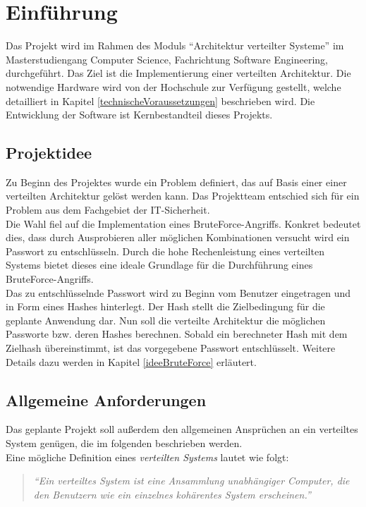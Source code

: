 \chapter{Einführung}
Das Projekt wird im Rahmen des Moduls \enquote{Architektur verteilter Systeme} im Masterstudiengang Computer Science, Fachrichtung Software Engineering, durchgeführt.  Das Ziel ist die Implementierung einer verteilten Architektur. Die notwendige Hardware wird von der Hochschule zur Verfügung gestellt, welche detailliert in Kapitel \ref{technischeVoraussetzungen} beschrieben wird.
Die Entwicklung der Software ist Kernbestandteil dieses Projekts. 
\section{Projektidee}
Zu Beginn des Projektes wurde ein Problem definiert, das auf Basis einer einer verteilten Architektur gelöst werden kann. Das Projektteam entschied sich für ein Problem aus dem Fachgebiet der IT-Sicherheit.\\
Die Wahl fiel auf die Implementation eines BruteForce-Angriffs. Konkret bedeutet dies, dass durch Ausprobieren aller möglichen Kombinationen versucht wird ein Passwort zu entschlüsseln. Durch die hohe Rechenleistung eines verteilten Systems bietet dieses eine ideale Grundlage für die Durchführung eines BruteForce-Angriffs.\\
 Das zu entschlüsselnde Passwort wird zu Beginn vom Benutzer eingetragen und in Form eines Hashes hinterlegt. Der Hash stellt die Zielbedingung für die geplante Anwendung dar. Nun soll die verteilte Architektur die möglichen Passworte bzw. deren Hashes berechnen. Sobald ein berechneter Hash mit dem Zielhash übereinstimmt, ist das vorgegebene Passwort entschlüsselt. Weitere Details dazu werden in Kapitel \ref{ideeBruteForce} erläutert. \\

\section{Allgemeine Anforderungen}
\label{allgemeineAnforderungen}
Das geplante Projekt soll außerdem den allgemeinen Ansprüchen an ein verteiltes System genügen, die im folgenden beschrieben werden. \\
Eine mögliche Definition eines \emph{verteilten Systems} lautet wie folgt:
\begin{quotation}
	\textit{\enquote{Ein verteiltes System ist eine Ansammlung unabhängiger Computer, die den Benutzern wie ein einzelnes kohärentes System erscheinen.}} \citep{tanenbaum}
\end{quotation}

